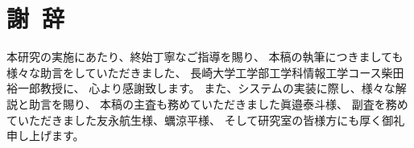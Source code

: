\chapter*{謝~辞}

本研究の実施にあたり、終始丁寧なご指導を賜り、
本稿の執筆につきましても様々な助言をしていただきました、
長崎大学工学部工学科情報工学コース柴田裕一郎教授に、
心より感謝致します。
また、システムの実装に際し、様々な解説と助言を賜り、
本稿の主査も務めていただきました眞邉泰斗様、
副査を務めていただきました友永航生様、蠣涼平様、
そして研究室の皆様方にも厚く御礼申し上げます。
